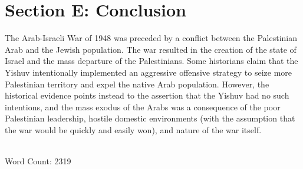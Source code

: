 \documentclass[12pt]{turabian-researchpaper}
\begin{document}

\section{Section E: Conclusion}
The Arab-Israeli War of 1948 was preceded by a conflict between the Palestinian Arab and the Jewish population.  The war resulted in the creation of the state of Israel and the mass departure of the Palestinians.  Some historians claim that the Yishuv intentionally implemented an aggressive offensive strategy to seize more Palestinian territory and expel the native Arab population.  However, the historical evidence points instead to the assertion that the Yishuv had no such intentions, and the mass exodus of the Arabs was a consequence of the poor Palestinian leadership, hostile domestic environments (with the assumption that the war would be quickly and easily won), and nature of the war itself.

~\\

Word Count: 2319

\printbibliography[title=Section F: Bibliography]{}
\end{document}
